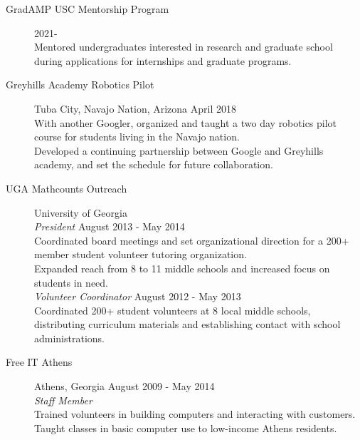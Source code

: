 \documentclass{article}
\begin{document}
\begin{description}

\item[GradAMP USC Mentorship Program] \hfill 2021-\\
Mentored undergraduates interested in research and graduate school during applications for internships and graduate programs.

\item[Greyhills Academy Robotics Pilot] Tuba City, Navajo Nation, Arizona
\hfill April 2018\\
With another Googler, organized and taught a two day robotics pilot course for students living in the Navajo nation.\\
Developed a continuing partnership between Google and Greyhills academy, and set the schedule for future collaboration.

\item[UGA Mathcounts Outreach] University of Georgia\\
\emph{President} \hfill August 2013 - May 2014\\
Coordinated board meetings and set organizational direction for a 200+ member student volunteer tutoring organization.\\
Expanded reach from 8 to 11 middle schools and increased focus on students in need.\\
\emph{Volunteer Coordinator} \hfill August 2012 - May 2013\\
Coordinated 200+ student volunteers at 8 local middle schools, distributing curriculum materials and establishing contact with school administrations.

\item[Free IT Athens] Athens, Georgia \hfill August 2009 - May 2014\\
\emph{Staff Member}\\
Trained volunteers in building computers and interacting with customers.\\
Taught classes in basic computer use to low-income Athens residents.

\end{description}
\end{document}
